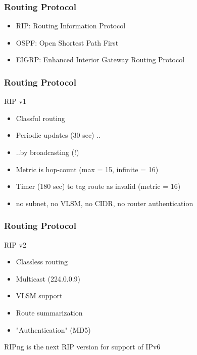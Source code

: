   \begin{frame}
    \frametitle{Routing Protocol}
    \begin{itemize}
      \item RIP: Routing Information Protocol \pause
      \item OSPF: Open Shortest Path First \pause
      \item EIGRP: Enhanced Interior Gateway Routing Protocol
    \end{itemize}
  \end{frame}

  \begin{frame}
    \frametitle{Routing Protocol}
      \begin{block}{RIP v1}
        \begin{itemize}
          \item Classful routing \pause
          \item Periodic updates (30 sec) .. \pause
          \item ..by broadcasting (!) \pause
          \item Metric is hop-count (max = 15, infinite = 16) \pause
          \item Timer (180 sec) to tag route as invalid (metric = 16) \pause
          \item no subnet, no VLSM, no CIDR, no router authentication
        \end{itemize}
      \end{block}
  \end{frame}
  \begin{frame}
    \frametitle{Routing Protocol}
      \begin{block}{RIP v2}
        \begin{itemize}
          \item Classless routing \pause
          \item Multicast (224.0.0.9) \pause
          \item VLSM support \pause
          \item Route summarization \pause
          \item "Authentication" (MD5)
        \end{itemize}
      \end{block}
      \pause
      \begin{center} RIPng is the next RIP version for support of IPv6 \end{center}
  \end{frame}
